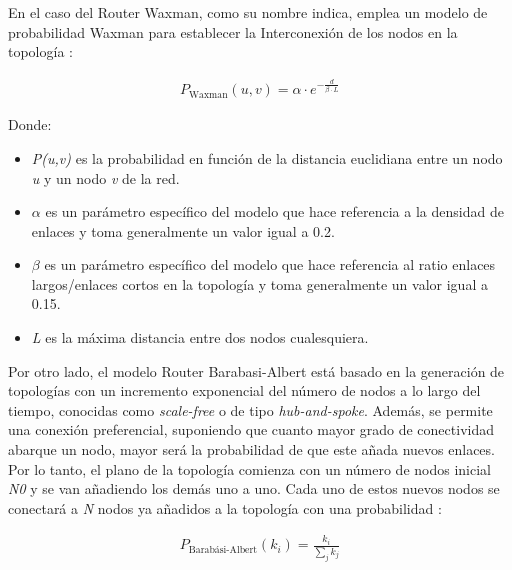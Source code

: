 \vspace{3mm}

En el caso del Router Waxman, como su nombre indica, emplea un modelo de probabilidad Waxman para establecer la Interconexión de los nodos en la topología \cite{brite_zegura}:

\begin{equation}
    \begin{aligned}
        P_{\text{Waxman}}(u,v) = \alpha \cdot e^{-\frac{d}{\beta \cdot L}}
    \end{aligned}
\end{equation} 

    Donde:
\begin{itemize}
    \renewcommand{\labelitemi}{}
    \item \textit{P(u,v)} es la probabilidad en función de la distancia euclidiana entre un nodo \textit{u} y un nodo \textit{v} de la red.
    \item $\alpha$ es un parámetro específico del modelo que hace referencia a la densidad de enlaces y toma generalmente un valor igual a 0.2.
    \item $\beta$ es un parámetro específico del modelo que hace referencia al ratio enlaces largos/enlaces cortos en la topología y toma generalmente un valor igual a 0.15.
    \item \textit{L} es la máxima distancia entre dos nodos cualesquiera.
\end{itemize}

\vspace{3mm}

Por otro lado, el modelo Router Barabasi-Albert está basado en la generación de topologías con un incremento exponencial del número de nodos a lo largo del tiempo, conocidas como \textit{scale-free} o de tipo \textit{hub-and-spoke}. Además, se permite una conexión preferencial, suponiendo que cuanto mayor grado de conectividad abarque un nodo, mayor será la probabilidad de que este añada nuevos enlaces. Por lo tanto, el plano de la topología comienza con un número de nodos inicial \textit{N0} y se van añadiendo los demás uno a uno. Cada uno de estos nuevos nodos se conectará a \textit{N} nodos ya añadidos a la topología con una probabilidad \cite{brite_zegura}:

\begin{equation}
    \begin{aligned}
        P_{\text{Barabási-Albert}}(k_i) = \frac{k_i}{\sum_{j}^{}k_j}
    \end{aligned}
\end{equation} 
    
